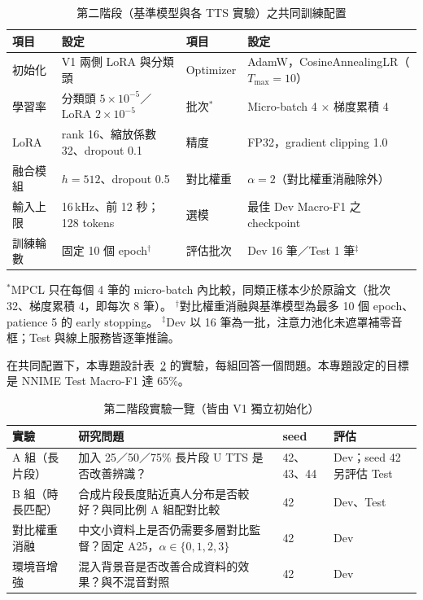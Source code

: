 \begin{table}[t]
\centering
\caption{第二階段（基準模型與各 TTS 實驗）之共同訓練配置}
\label{tab:config}
\small
\begin{tabularx}{\textwidth}{@{}lXlX@{}}
\toprule
項目 & 設定 & 項目 & 設定\\
\midrule
初始化 & V1 兩側 LoRA 與分類頭 & Optimizer & AdamW，CosineAnnealingLR（$T_{\max}=10$）\\
學習率 & 分類頭 $5\times10^{-5}$／LoRA $2\times10^{-5}$ & 批次$^{*}$ & Micro-batch 4 × 梯度累積 4\\
LoRA & rank 16、縮放係數 32、dropout 0.1 & 精度 & FP32，gradient clipping 1.0\\
融合模組 & $h=512$、dropout 0.5 & 對比權重 & $\alpha=2$（對比權重消融除外）\\
輸入上限 & 16\,kHz、前 12 秒；128 tokens & 選模 & 最佳 Dev Macro-F1 之 checkpoint\\
訓練輪數 & 固定 10 個 epoch$^{\dagger}$ & 評估批次 & Dev 16 筆／Test 1 筆$^{\ddagger}$\\
\bottomrule
\end{tabularx}
\par\smallskip\footnotesize
$^{*}$MPCL 只在每個 4 筆的 micro-batch 內比較，同類正樣本少於原論文（批次 32、梯度累積 4，即每次 8 筆）。
$^{\dagger}$對比權重消融與基準模型為最多 10 個 epoch、patience 5 的 early stopping。
$^{\ddagger}$Dev 以 16 筆為一批，注意力池化未遮罩補零音框；Test 與線上服務皆逐筆推論。
\end{table}

在共同配置下，本專題設計表~\ref{tab:experiments} 的實驗，每組回答一個問題。本專題設定的目標是 NNIME Test Macro-F1 達 65\%。

\begin{table}[t]
\centering
\caption{第二階段實驗一覽（皆由 V1 獨立初始化）}
\label{tab:experiments}
\small
\begin{tabularx}{\textwidth}{@{}l>{\raggedright\arraybackslash}Xll@{}}
\toprule
實驗 & 研究問題 & seed & 評估\\
\midrule
A 組（長片段） & 加入 25／50／75\% 長片段 U TTS 是否改善辨識？ & 42、43、44 & Dev；seed 42 另評估 Test\\
B 組（時長匹配） & 合成片段長度貼近真人分布是否較好？與同比例 A 組配對比較 & 42 & Dev、Test\\
對比權重消融 & 中文小資料上是否仍需要多層對比監督？固定 A25，$\alpha\in\{0,1,2,3\}$ & 42 & Dev\\
環境音增強 & 混入背景音是否改善合成資料的效果？與不混音對照 & 42 & Dev\\
\bottomrule
\end{tabularx}
\end{table}

